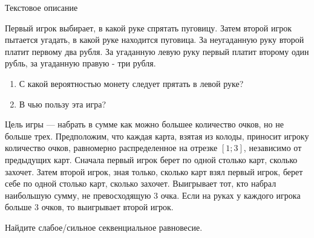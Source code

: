 \begin{problem} 
 Текстовое описание \par
Первый игрок выбирает, в какой руке спрятать пуговицу. Затем второй
игрок пытается угадать, в какой руке находится пуговица. За
неугаданную руку второй платит первому два рубля. За угаданную
левую руку первый платит второму один рубль, за угаданную правую -
три рубля. \par
\begin{enumerate}
\item С какой вероятностью монету следует прятать в левой руке? \par
\item В чью пользу эта игра? \par
\end{enumerate}


\begin{sol}

\end{sol}
\end{problem}




\begin{problem}
\begin{source}
\cite{lones:dtc}
\end{source}
Цель игры — набрать в сумме как можно большее количество очков, но не больше трех. Предположим, что каждая карта, взятая из колоды, приносит игроку количество очков, равномерно распределенное на отрезке $[1;3]$, независимо от предыдущих карт. Сначала первый игрок берет по одной столько карт, сколько захочет. Затем второй игрок, зная только, сколько карт взял первый игрок, берет себе по одной столько карт, сколько захочет. Выигрывает тот, кто набрал наибольшую сумму, не превосходящую 3 очка. Если на руках у каждого игрока больше 3 очков, то выигрывает второй игрок. \par
Найдите слабое/сильное секвенциальное равновесие.





\begin{sol}

\end{sol}
\end{problem}



